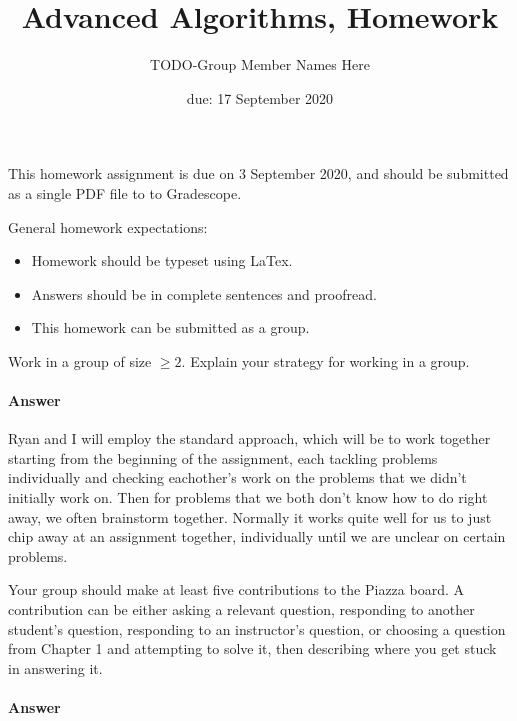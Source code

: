 \documentclass{article}
\title{Advanced Algorithms, Homework \hwnum}
\author{TODO-Group Member Names Here}
\date{due: 17 September 2020}
\begin{document}
\maketitle

This homework assignment is due on 3 September 2020, and should be
submitted as a single PDF file to to Gradescope.

General homework expectations:
\begin{itemize}
    \item Homework should be typeset using LaTex.
    \item Answers should be in complete sentences and proofread.
    \item This homework can be submitted as a group.
\end{itemize}

\nextprob
{}

Work in a group of size $\geq 2$.  Explain your strategy for working in a group.

\paragraph{Answer}


Ryan and I will employ the standard approach, which will be to work together
starting from the beginning of the assignment, each tackling problems individually and
checking eachother's work on the problems that we didn't initially work on. Then for problems
that we both don't know how to do right away, we often brainstorm together. Normally it works
quite well for us to just chip away at an assignment together, individually until we are unclear on
certain problems.


\nextprob
{}

Your group should make at least five contributions to the Piazza board.  A
contribution can be either asking a relevant question, responding to another
student's question, responding to an instructor's question, or choosing a
question from Chapter 1 and attempting to solve it, then  describing where you
get stuck in answering it.

\paragraph{Answer}

\end{document}
